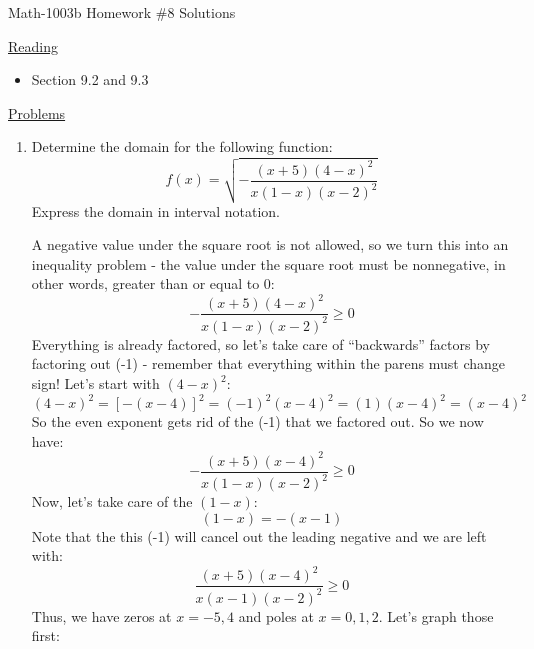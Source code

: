 \documentclass[letterpaper,12pt,fleqn]{article}
\begin{document}
\begin{center}
\Large Math-1003b Homework \#8 Solutions
\end{center}

\vspace{0.5in}

\underline{Reading}

\bigskip

\begin{itemize}
\item Section 9.2 and 9.3
\end{itemize}

\bigskip

\underline{Problems}

\bigskip

\begin{enumerate}
\item Determine the domain for the following function:
  \[f(x)=\sqrt{-\frac{(x+5)(4-x)^2}{x(1-x)(x-2)^2}}\]
  Express the domain in interval notation.

  A negative value under the square root is not allowed, so we turn this into
  an inequality problem - the value under the square root must be nonnegative,
  in other words, greater than or equal to 0:
  \[-\frac{(x+5)(4-x)^2}{x(1-x)(x-2)^2}\ge0\]
  Everything is already factored, so let's take care of ``backwards'' factors
  by factoring out (-1) - remember that everything within the parens must
  change sign! Let's start with $(4-x)^2$:
  \[(4-x)^2=[-(x-4)]^2=(-1)^2(x-4)^2=(1)(x-4)^2=(x-4)^2\]
  So the even exponent gets rid of the (-1) that we factored out. So we now
  have:
  \[-\frac{(x+5)(x-4)^2}{x(1-x)(x-2)^2}\ge0\]
  Now, let's take care of the $(1-x)$:
  \[(1-x)=-(x-1)\]
  Note that the this (-1) will cancel out the leading negative and we are left
  with:
  \[\frac{(x+5)(x-4)^2}{x(x-1)(x-2)^2}\ge0\]
  Thus, we have zeros at $x=-5,4$ and poles at $x=0,1,2$. Let's graph those
  first:

  \bigskip



\end{enumerate}
\end{document}
